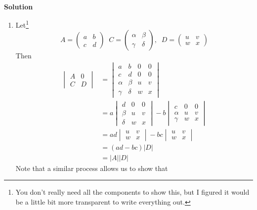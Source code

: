 \documentclass[11pt]{article}
\begin{document}
\

\noindent \textbf{Solution}\\
\begin{enumerate}
\item Let\footnote{You don't really need all the components to show this, but I figured it would be a little bit more transparent to write everything out.}
$$A=\begin{pmatrix} a & b \\ c & d \end{pmatrix} \;\; C = \begin{pmatrix} \alpha & \beta \\ \gamma & \delta \end{pmatrix}, \;\; D = \begin{pmatrix} u & v \\ w & x \end{pmatrix} $$
Then
\begin{align*}
\begin{vmatrix} A & 0 \\ C & D \end{vmatrix} &= \begin{vmatrix} a & b & 0 & 0 \\ c & d & 0 & 0 \\ \alpha & \beta & u & v \\ \gamma & \delta & w & x \end{vmatrix}\\
&= a \begin{vmatrix} d & 0 & 0 \\ \beta & u & v \\  \delta & w & x \end{vmatrix} - b\begin{vmatrix} c  & 0 & 0 \\ \alpha & u & v \\ \gamma & w & x \end{vmatrix}\\
&= ad  \begin{vmatrix}  u & v \\ w & x \end{vmatrix} - bc \begin{vmatrix}  u & v \\ w & x \end{vmatrix}\\
&= (ad-bc) \vert D \vert \\
&= \vert A \vert \vert D \vert
\end{align*}
Note that a similar process allows us to show that 

\end{enumerate}
\end{document}
